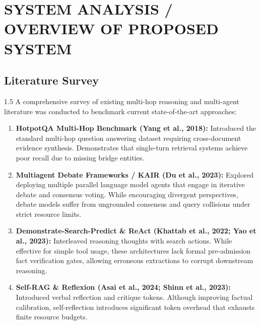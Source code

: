 \documentclass[12pt,a4paper]{report}
\begin{document}
\chapter{SYSTEM ANALYSIS / OVERVIEW OF PROPOSED SYSTEM}

\section{Literature Survey}
\begin{spacing}{1.5}
A comprehensive survey of existing multi-hop reasoning and multi-agent literature was conducted to benchmark current state-of-the-art approaches:

\begin{enumerate}
    \item \textbf{HotpotQA Multi-Hop Benchmark (Yang et al., 2018):} Introduced the standard multi-hop question answering dataset requiring cross-document evidence synthesis. Demonstrates that single-turn retrieval systems achieve poor recall due to missing bridge entities.
    \item \textbf{Multiagent Debate Frameworks / KAIR (Du et al., 2023):} Explored deploying multiple parallel language model agents that engage in iterative debate and consensus voting. While encouraging divergent perspectives, debate models suffer from ungrounded consensus and query collisions under strict resource limits.
    \item \textbf{Demonstrate-Search-Predict \& ReAct (Khattab et al., 2022; Yao et al., 2023):} Interleaved reasoning thoughts with search actions. While effective for simple tool usage, these architectures lack formal pre-admission fact verification gates, allowing erroneous extractions to corrupt downstream reasoning.
    \item \textbf{Self-RAG \& Reflexion (Asai et al., 2024; Shinn et al., 2023):} Introduced verbal reflection and critique tokens. Although improving factual calibration, self-reflection introduces significant token overhead that exhausts finite resource budgets.
\end{enumerate}
\end{spacing}
\end{document}
